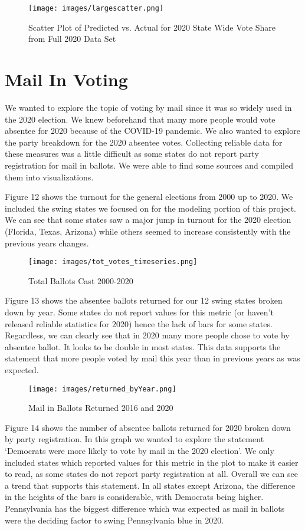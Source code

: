 \documentclass[letterpaper, twocolumn]{article}
\begin{document}
\begin{figure}[h]
    \centering
    \texttt{[image: images/largescatter.png]}
    \caption{Scatter Plot of Predicted vs. Actual for 2020 State Wide Vote Share from Full 2020 Data Set}
    \label{fig:arstmade}
\end{figure}


\section{Mail In Voting}
We wanted to explore the topic of voting by mail since it was so widely used in the 2020 election. We knew beforehand that many more people would vote absentee for 2020 because of the COVID-19 pandemic. We also wanted to explore the party breakdown for the 2020 absentee votes. Collecting reliable data for these measures was a little difficult as some states do not report party registration for mail in ballots. We were able to find some sources and compiled them into visualizations.

Figure 12 shows the turnout for the general elections from 2000 up to 2020. We included the swing states we focused on for the modeling portion of this project. We can see that some states saw a major jump in turnout for the 2020 election (Florida, Texas, Arizona) while others seemed to increase consistently with the previous years changes.

\begin{figure}[h]
    \centering
    \texttt{[image: images/tot\_votes\_timeseries.png]}
    \caption{Total Ballots Cast 2000-2020}
    \label{fig:arstmade}
\end{figure}

Figure 13 shows the absentee ballots returned for our 12 swing states broken down by year. Some states do not report values for this metric (or haven’t released reliable statistics for 2020) hence the lack of bars for some states. Regardless, we can clearly see that in 2020 many more people chose to vote by absentee ballot. It looks to be double in most states. This data supports the statement that more people voted by mail this year than in previous years as was expected.

\begin{figure}[h]
    \centering
    \texttt{[image: images/returned\_byYear.png]}
    \caption{Mail in Ballots Returned 2016 and 2020}
    \label{fig:arstmade}
\end{figure}


Figure 14 shows the number of absentee ballots returned for 2020 broken down by party registration. In this graph we wanted to explore the statement ‘Democrats were more likely to vote by mail in the 2020 election’. We only included states which reported values for this metric in the plot to make it easier to read, as some states do not report party registration at all. Overall we can see a trend that supports this statement. In all states except Arizona, the difference in the heights of the bars is considerable, with Democrats being higher. Pennsylvania has the biggest difference which was expected as mail in ballots were the deciding factor to swing Pennsylvania blue in 2020.
\end{document}

